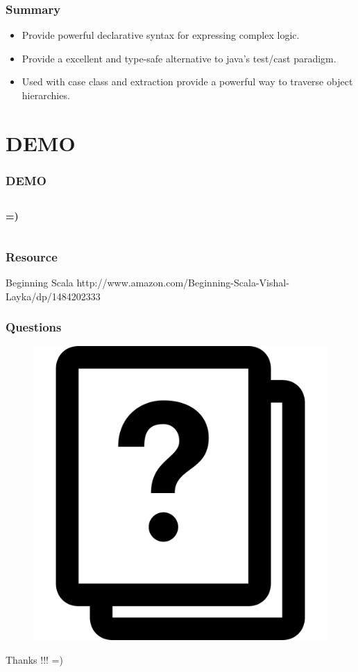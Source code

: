 \documentclass{beamer}
\begin{document}
\begin{frame}
\frametitle{Summary}
\begin{itemize}
\item Provide powerful declarative syntax for expressing complex logic.
\item Provide a excellent and type-safe alternative to java's test/cast paradigm.
\item Used with case class and extraction provide a powerful way to traverse object hierarchies.
\end{itemize}
\end{frame}
\section{DEMO} %
\begin{frame}
\frametitle{DEMO}
\begin{columns}[c]
\textbf{=)}
\end{columns}
\end{frame}
\begin{frame}
\frametitle{Resource}
\footnotesize{
\begin{thebibliography}{99} %
 Beginning Scala
\newblock http://www.amazon.com/Beginning-Scala-Vishal-Layka/dp/1484202333
\end{thebibliography}
}
\end{frame}
\begin{frame}
\frametitle{Questions}
\begin{figure}
\includegraphics[width=0.4\linewidth]{preguntas.png}
\end{figure}
\end{frame}
\begin{frame}
\Huge{\centerline{Thanks !!! =)}}
\end{frame}
\end{document}
